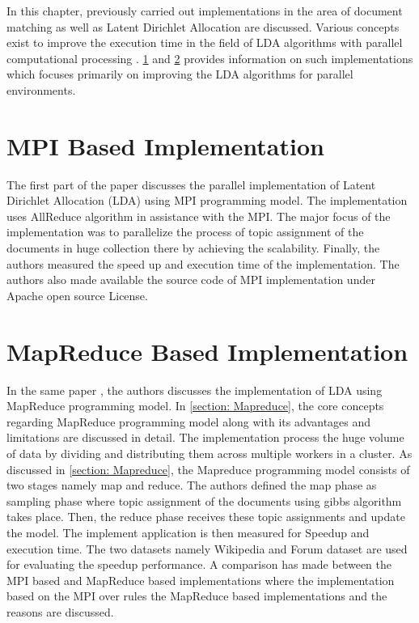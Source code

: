 
\label{relatedwork}

In this chapter, previously carried out implementations in the area of document matching as well as Latent Dirichlet Allocation are discussed. Various concepts exist to improve the execution time in the field of LDA algorithms with parallel computational processing .  \ref{section: mpi based} and \ref{section: Mapreduce based} provides information on such implementations which focuses primarily on improving the LDA algorithms for parallel environments.


\section{MPI Based Implementation}
\label{section: mpi based}
The first part of the paper \cite{wang2009plda} discusses the parallel implementation of Latent Dirichlet Allocation (LDA) using MPI programming model. The implementation uses AllReduce algorithm in assistance with the MPI. The major focus of the implementation was to parallelize the process of  topic assignment of the documents in huge collection there by achieving the scalability. Finally, the authors measured the speed up and execution time of the implementation. The authors also made available the source code of MPI implementation under Apache open source License.

\section{MapReduce Based Implementation}
\label{section: Mapreduce based}

In the same paper \cite{wang2009plda}, the authors discusses the implementation of LDA using MapReduce programming model. In \ref{section: Mapreduce}, the core concepts regarding MapReduce programming model along with its advantages and limitations are discussed in detail. The implementation process the huge volume of data by dividing and distributing them across multiple workers in a cluster. As discussed in \ref{section: Mapreduce}, the Mapreduce programming model consists of two stages namely map and reduce. The authors defined the map phase as sampling phase where topic assignment of the documents using gibbs algorithm takes place. Then, the reduce phase receives these topic assignments and update the model. The implement application is then measured for Speedup and execution time. The two datasets namely Wikipedia and Forum dataset are used for evaluating the speedup performance. A comparison has made between the MPI based and MapReduce based implementations where the implementation based on the MPI over rules the MapReduce based implementations and the reasons are discussed.


